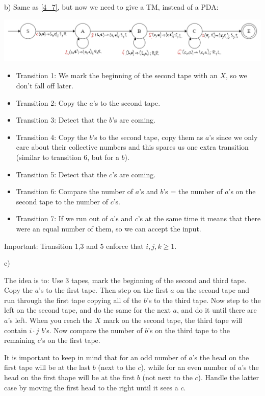 b) Same as \ref{4_7}, but now we need to give a TM, instead of a PDA:

\includegraphics[width=\linewidth]{06/6_7_b_canvas.png}

\begin{itemize}
    \item Transition 1: We mark the beginning of the second tape with an $X$, so we don't fall off later.
    \item Transition 2: Copy the $a$'s to the second tape.
    \item Transition 3: Detect that the $b$'s are coming.
    \item Transition 4: Copy the $b$'s to the second tape, copy them as $a$'s since we only care about their collective numbers and this spares us one extra transition (similar to transition 6, but for a $b$).
    \item Transition 5: Detect that the $c$'s are coming.
    \item Transition 6: Compare the number of $a$'s and $b$'s = the number of $a$'s on the second tape to the number of $c$'s.
    \item Transition 7: If we run out of $a$'s and $c$'s at the same time it means that there were an equal number of them, so we can accept the input.
\end{itemize}

Important: Transition 1,3 and 5 enforce that $i,j,k \geq{} 1$.

c) 

The idea is to: Use 3 tapes, mark the beginning of the second and third tape. Copy the $a$'s to the first tape. Then step on the first $a$ on the second tape and run through the first tape copying all of the $b$'s to the third tape. Now step to the left on the second tape, and do the same for the next $a$, and do it until there are $a$'s left. When you reach the $X$ mark on the second tape, the third tape will contain $i \cdot j$ $b$'s. Now compare the number of $b$'s on the third tape to the remaining $c$'s on the first tape.

It is important to keep in mind that for an odd number of $a$'s the head on the first tape will be at the last $b$ (next to the $c$), while for an even number of $a$'s the head on the first thape will be at the first $b$ (not next to the $c$). Handle the latter case by moving the first head to the right until it sees a $c$.